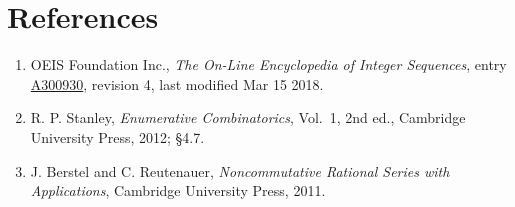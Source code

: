 \documentclass[11pt]{article}
\theoremstyle{definition}
\begin{document}
\section{References}

\begin{enumerate}

\item OEIS Foundation Inc., \emph{The On-Line Encyclopedia of Integer Sequences}, entry \href{https://oeis.org/A300930}{A300930}, revision 4, last modified Mar 15 2018.

\item R. P. Stanley, \emph{Enumerative Combinatorics}, Vol.~1, 2nd ed., Cambridge University Press, 2012; \S4.7.

\item J. Berstel and C. Reutenauer, \emph{Noncommutative Rational Series with Applications}, Cambridge University Press, 2011.

\end{enumerate}
\end{document}

